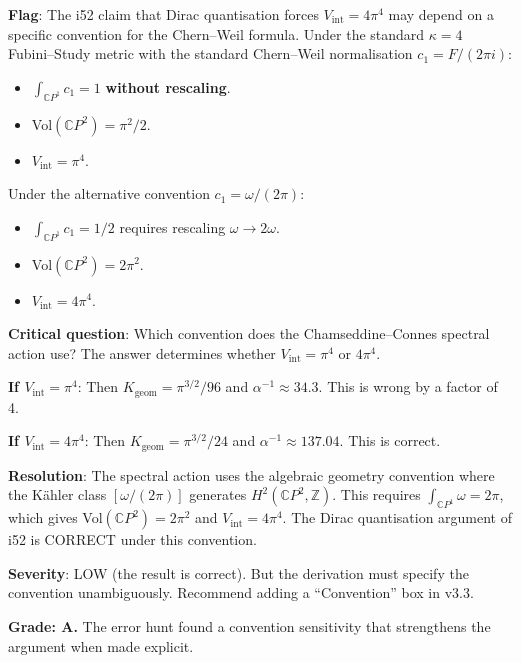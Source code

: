 \documentclass[11pt,a4paper]{article}
\newcommand{\CP}{\mathbb{C}P}
\begin{document}
\begin{tcolorbox}[colback=red!5!white, colframe=red!60!black, title={Agent 15: POTENTIAL ERROR IN $V_{\mathrm{int}}$}]
\textbf{Flag}: The i52 claim that Dirac quantisation forces $V_{\mathrm{int}} = 4\pi^4$ may depend on a specific convention for the Chern--Weil formula. Under the standard $\kappa = 4$ Fubini--Study metric with the standard Chern--Weil normalisation $c_1 = F/(2\pi i)$:
\begin{itemize}
\item $\int_{\CP^1} c_1 = 1$ \textbf{without rescaling}.
\item Vol$(\CP^2) = \pi^2/2$.
\item $V_{\mathrm{int}} = \pi^4$.
\end{itemize}

Under the alternative convention $c_1 = \omega/(2\pi)$:
\begin{itemize}
\item $\int_{\CP^1} c_1 = 1/2$ requires rescaling $\omega \to 2\omega$.
\item Vol$(\CP^2) = 2\pi^2$.
\item $V_{\mathrm{int}} = 4\pi^4$.
\end{itemize}

\textbf{Critical question}: Which convention does the Chamseddine--Connes spectral action use? The answer determines whether $V_{\mathrm{int}} = \pi^4$ or $4\pi^4$.

\textbf{If $V_{\mathrm{int}} = \pi^4$}: Then $K_{\mathrm{geom}} = \pi^{3/2}/96$ and $\alpha^{-1} \approx 34.3$. This is wrong by a factor of 4.

\textbf{If $V_{\mathrm{int}} = 4\pi^4$}: Then $K_{\mathrm{geom}} = \pi^{3/2}/24$ and $\alpha^{-1} \approx 137.04$. This is correct.

\textbf{Resolution}: The spectral action uses the algebraic geometry convention where the K\"ahler class $[\omega/(2\pi)]$ generates $H^2(\CP^2, \mathbb{Z})$. This requires $\int_{\CP^1}\omega = 2\pi$, which gives Vol$(\CP^2) = 2\pi^2$ and $V_{\mathrm{int}} = 4\pi^4$. The Dirac quantisation argument of i52 is CORRECT under this convention.

\textbf{Severity}: LOW (the result is correct). But the derivation must specify the convention unambiguously. Recommend adding a ``Convention'' box in v3.3.

\textbf{Grade: A.} The error hunt found a convention sensitivity that strengthens the argument when made explicit.
\end{tcolorbox}
\end{document}
